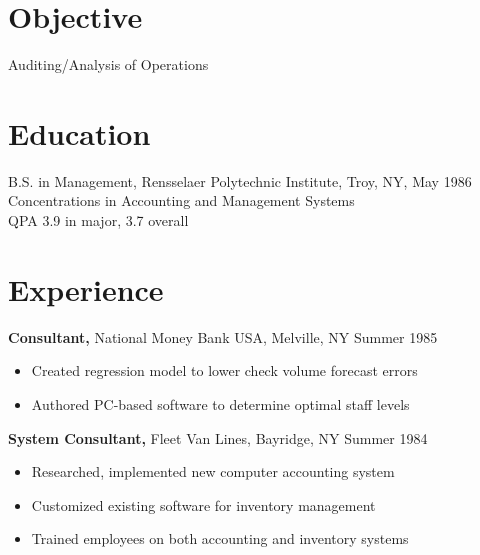 \documentclass[margin]{res}
\begin{document}
 
 
 
\address{{\bf Present Address} \\ 1503 Washington Heights \\ 3418 Butler House, Mary Markley Hall \\ Ann Arbor, MI 48109  \\
        (978) 873-7207 }
\address{{\bf Permanent Address} \\ 1499 Salem Street \\ North Andover, MA 01845 \\
        (978) 725-4887 }

 
\begin{resume} 
 
\section{Objective} 
Auditing/Analysis of Operations 

\section{Education} 
B.S. in Management, Rensselaer Polytechnic Institute, Troy, NY, May 1986 \\
Concentrations in Accounting and Management Systems \\
QPA 3.9 in major, 3.7 overall
 

\section{Experience}
 {\bf Consultant,} National Money Bank USA, Melville, NY \hfill Summer  1985
 \begin{itemize} \itemsep -2pt  %
 \item Created regression model to lower check volume 
                 forecast errors
 \item Authored PC-based software to determine optimal 
                 staff levels 
 \end{itemize}

 
 
{\bf System Consultant,} Fleet Van Lines, Bayridge, NY \hfill  Summer 1984
\begin{itemize} \itemsep -2pt %
\item Researched, implemented new computer accounting 
                 system 
\item Customized existing software for inventory 
                 management 
\item Trained employees on both accounting and inventory 
                 systems 
\end{itemize}


\end{resume}
\end{document}
